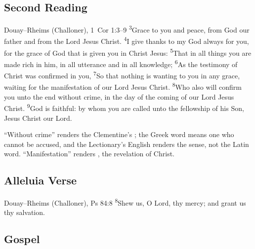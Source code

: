 \subsection{Second Reading}
\label{proper-second-reading}


\begin{englishwitness}{Douay--Rheims (Challoner), 1~Cor 1:3--9}
\textsuperscript{3}Grace to you and peace, from God our father and from the
Lord Jesus Christ. \textsuperscript{4}I give thanks to my God always for you,
for the grace of God that is given you in Christ Jesus:
\textsuperscript{5}That in all things you are made rich in him, in all
utterance and in all knowledge; \textsuperscript{6}As the testimony of Christ
was confirmed in you, \textsuperscript{7}So that nothing is wanting to you in
any grace, waiting for the manifestation of our Lord Jesus Christ.
\textsuperscript{8}Who also will confirm you unto the end without crime, in
the day of the coming of our Lord Jesus Christ. \textsuperscript{9}God is
faithful: by whom you are called unto the fellowship of his Son, Jesus Christ
our Lord.
\end{englishwitness}

\noindent ``Without crime'' renders the Clementine's ; the
Greek word means one who cannot be accused, and the Lectionary's English
renders the sense, not the Latin word. ``Manifestation'' renders
, the revelation of Christ.

\subsection{Alleluia Verse}
\label{proper-acclamation}


\begin{englishwitness}{Douay--Rheims (Challoner), Ps 84:8}
\textsuperscript{8}Shew us, O Lord, thy mercy; and grant us thy salvation.
\end{englishwitness}

\subsection{Gospel}
\label{proper-gospel}

